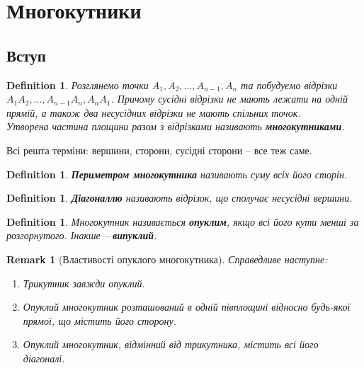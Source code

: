 \documentclass[a4paper, 10pt]{article}
\theoremstyle{theoremdd}
\theoremstyle{theoremdd}
\theoremstyle{theoremdd}
\newtheorem{definition}[theorem]{Definition}
\theoremstyle{theoremdd}
\theoremstyle{theoremdd}
\theoremstyle{theoremdd}
\theoremstyle{theoremdd}
\newtheorem{remark}[theorem]{Remark}
\theoremstyle{theoremdd}
\theoremstyle{theoremdd}
\begin{document}
\newpage

\section{Многокутники}
\subsection{Вступ}
\begin{definition}
Розглянемо точки $A_1,A_2,\dots,A_{n-1}, A_n$ та побудуємо відрізки $A_1A_2,\dots, A_{n-1}A_n, A_nA_1$. Причому сусідні відрізки не мають лежати на одній прямій, а також два несусідних відрізки не мають спільних точок.\\
Утворена частина площини разом з відрізками називають \textbf{многокутниками}.
\begin{figure}[H]
\centering
{}
\end{figure}
\end{definition}
Всі решта терміни: вершини, сторони, сусідні сторони -- все теж саме.
\begin{definition}
\textbf{Периметром многокутника} називають суму всіх його сторін.
\end{definition}

\begin{definition}
\textbf{Діагоналлю} називають відрізок, що сполучає несусідні вершини.
\end{definition}

\begin{definition}
Многокутник називається \textbf{опуклим}, якщо всі його кути менші за розгорнутого. Інакше -- \textbf{випуклий}.
\end{definition}

\begin{remark}[Властивості опуклого многокутника]
Справедливе наступне:
\begin{enumerate}[nosep,wide=0pt,label={\arabic*)}]
\item Трикутник завжди опуклий.
\item Опуклий многокутник розташований в одній півплощині відносно будь-якої прямої, що містить його сторону.
\item Опуклий многокутник, відмінний від трикутника, містить всі його діагоналі.
\end{enumerate}
\end{remark}
\end{document}
